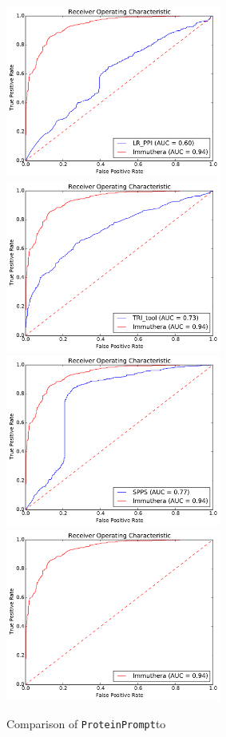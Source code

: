 \documentclass[preprint,3p,times,twocolumn]{elsarticle}
\newcommand{\tool}{\texttt{ProteinPrompt}\hspace{2pt}}
\begin{document}
\begin{figure}
  \includegraphics[width=200pt]{img/LR_PPI_roc.pdf}
  \includegraphics[width=200pt]{img/TRI_tool_roc.pdf} \\

  \includegraphics[width=200pt]{img/SPPS_roc.pdf}
  \includegraphics[width=200pt]{img/meta_roc.pdf}
  \caption{Comparison of \tool to }
\end{figure} 
\end{document}
